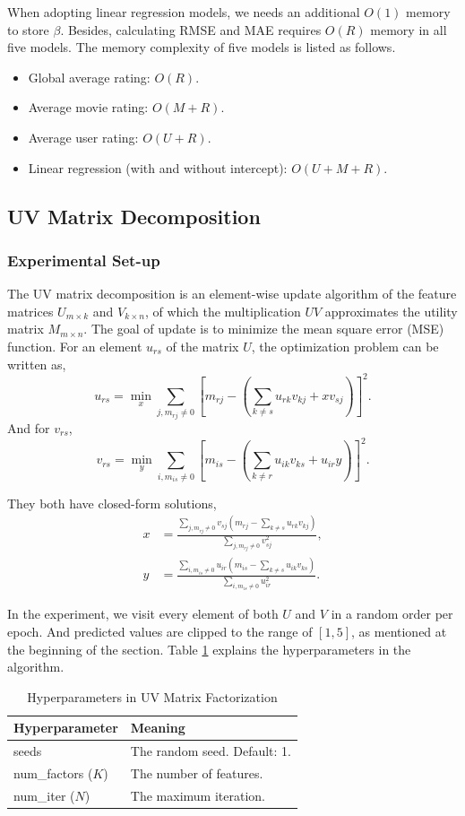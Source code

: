 \documentclass{article}
\begin{document}
When adopting linear regression models, we needs an additional $O(1)$ memory to store $\beta$. Besides, calculating RMSE and MAE requires $O(R)$ memory in all five models. The memory complexity of five models is listed as follows.
\begin{itemize}
    \item Global average rating: $O(R)$.
    \item Average movie rating: $O(M + R)$.
    \item Average user rating: $O(U + R)$.
    \item Linear regression (with and without intercept): $O(U + M + R)$.
\end{itemize}

\subsection{UV Matrix Decomposition}
\subsubsection{Experimental Set-up}
The UV matrix decomposition is an element-wise update algorithm of the feature matrices $U_{m\times k}$ and $V_{k\times n}$, of which the multiplication $UV$ approximates the utility matrix $M_{m\times n}$. The goal of update is to minimize the mean square error (MSE) function. For an element $u_{rs}$ of the matrix $U$, the optimization problem can be written as,
\[
u_{rs} = \min_{x} \sum_{j, m_{rj}\neq 0}\left[ m_{rj}-\left( \sum_{k\neq s}u_{rk}v_{kj} + xv_{sj} \right) \right]^2.
\]
And for $v_{rs}$,
\[
v_{rs} = \min_{y} \sum_{i, m_{is}\neq 0}\left[ m_{is}-\left( \sum_{k\neq r}u_{ik}v_{ks} + u_{ir}y \right) \right]^2.
\]

They both have closed-form solutions,
\begin{align*}
x &= \frac{\sum\limits_{j, m_{rj}\neq 0}v_{sj}\left(m_{rj}-\sum\limits_{k\neq s }u_{rk}v_{kj}\right)}
{\sum\limits_{j, m_{rj}\neq 0}v_{sj}^2},\\
y &= \frac{\sum\limits_{i, m_{is}\neq 0}u_{ir}\left(m_{is}-\sum\limits_{k\neq s }u_{ik}v_{ks}\right)}
{\sum\limits_{i, m_{is}\neq 0}u_{ir}^2}. 
\end{align*}

In the experiment, we visit every element of both $U$ and $V$ in a random order per epoch. And predicted values are clipped to the range of $[1,5]$, as mentioned at the beginning of the section. Table \ref{tab:1.2-hyper} explains the hyperparameters in the algorithm.
\begin{table}[ht]
    \centering
    \caption{Hyperparameters in UV Matrix Factorization}
    \label{tab:1.2-hyper}
    \begin{tabular}{ll}
        \toprule
        \textbf{Hyperparameter} & \textbf{Meaning}\\
        \midrule
        seeds & The random seed. Default: 1.\\
        num\_factors ($K$) & The number of features.\\
        num\_iter ($N$) & The maximum iteration.\\
        \bottomrule
    \end{tabular}
\end{table}
\end{document}

